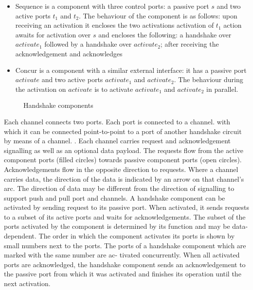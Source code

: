 \begin{itemize}
\item
Sequence is a component with three control ports: a passive port $s$ and two active ports $t_1$ and $t_2$.
The behaviour of the component is as follows: upon receiving an activation it encloses the two activations activation of $t_1$ action   awaits for activation over $s$ and encloses the following: a handshake over $activate_1$ followed by a handshake over $activate_2$; after receiving the acknowledgement  and acknowledges

\item
Concur is a component with a similar external interface: it has a passive port $activate$ and two active ports $activate_1$ and $activate_2$.
The behaviour during the activation on $activate$ is to activate $activate_1$ and $activate_2$ in parallel.
\end{itemize}



\begin{figure}
\centering
{} {}
 {}
 {}
 {}
 {}
 {}

\caption{Handshake components}
\end{figure}





 Each channel connects two ports. Each port is connected to a channel. 
with which it
can be connected point-to-point to a port of another handshake circuit by means of a channel. 
. Each
channel carries request and acknowledgement signalling as well as an optional data payload. The
requests flow from the active component ports (filled circles) towards passive component ports
(open circles). Acknowledgements flow in the opposite direction to requests. Where a channel
carries data, the direction of the data is indicated by an arrow on that channel’s arc. The direction
of data may be different from the direction of signalling to support push and pull port and channels.
A handshake component can be activated by sending request to its passive port. When activated, 
it sends requests to a subset of its active ports and waits for acknowledgements. The
subset of the ports activated by the component is determined by its function and may be data-
dependent. The order in which the component activates its ports is shown by small numbers next
to the ports. The ports of a handshake component which are marked with the same number are ac-
tivated concurrently. When all activated ports are acknowledged, the handshake component sends
an acknowledgement to the passive port from which it was activated and finishes its operation until
the next activation.
